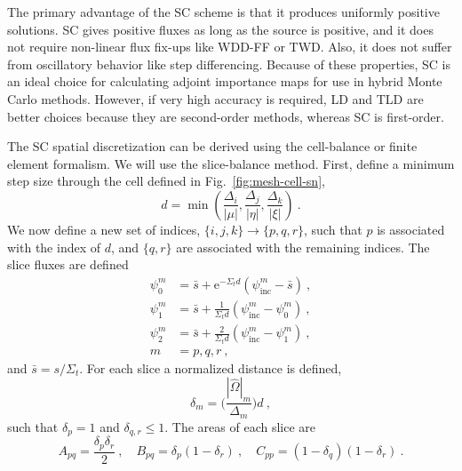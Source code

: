 \documentclass[12pt]{article}
\newcommand{\vOmega}{\ensuremath{\hat{\Omega}}}
\newcommand{\Di}{\ensuremath{\Delta_i}}
\newcommand{\Dj}{\ensuremath{\Delta_j}}
\newcommand{\Dk}{\ensuremath{\Delta_k}}
\begin{document}
The primary advantage of the SC scheme is that it produces uniformly positive
solutions. SC gives positive fluxes as long as the source is positive, and it
does not require non-linear flux fix-ups like WDD-FF or TWD.  Also, it does
not suffer from oscillatory behavior like step differencing.  Because of these
properties, SC is an ideal choice for calculating adjoint importance maps for
use in hybrid Monte Carlo methods.  However, if very high accuracy is
required, LD and TLD are better choices because they are second-order methods,
whereas SC is first-order.

The SC spatial discretization can be derived using the cell-balance or finite
element formalism.  We will use the slice-balance method.%
First, define a minimum step size through the
cell defined in Fig.~\ref{fig:mesh-cell-sn},
\begin{equation}
  d = \min\left(\frac{\Di}{|\mu|}, \frac{\Dj}{|\eta|},
    \frac{\Dk}{|\xi|}\right)\:.
\end{equation}
We now define a new set of indices, $\{i,j,k\}\rightarrow\{p,q,r\}$, such that
$p$ is associated with the index of $d$,
and $\{q,r\}$ are associated with the remaining indices.  The slice fluxes are
defined
\begin{equation}
  \begin{aligned}
    \psi^m_0 &= \bar{s} + \text{e}^{-\Sigma_t d}(\psi^m_{\text{inc}} -
    \bar{s})\:,\\ \psi^m_1 &= \bar{s} + \frac{1}{\Sigma_t d}(\psi^m_{\text{inc}}
    - \psi^m_0)\:,\\ \psi^m_2 &= \bar{s} + \frac{2}{\Sigma_t
      d}(\psi^m_{\text{inc}} - \psi^m_1)\:,\\ m &= p,q,r\:,
  \end{aligned}
  \label{eq:slice-fluxes}
\end{equation}
and $\bar{s} = s/\Sigma_t$.  For each slice a normalized distance is defined,
\begin{equation}
  \delta_m = \biggl(\frac{|\vOmega|_m}{\Delta_m}\biggr)d\:,
\end{equation}
such that $\delta_p = 1$ and $\delta_{q,r}\le 1$.  The areas of each slice are
\begin{equation}
  A_{pq} = \frac{\delta_p\delta_r}{2}\:,\quad B_{pq} =
  \delta_p(1-\delta_r)\:,\quad C_{pp} = (1-\delta_q)(1-\delta_r)\:.
\end{equation}
\end{document}
